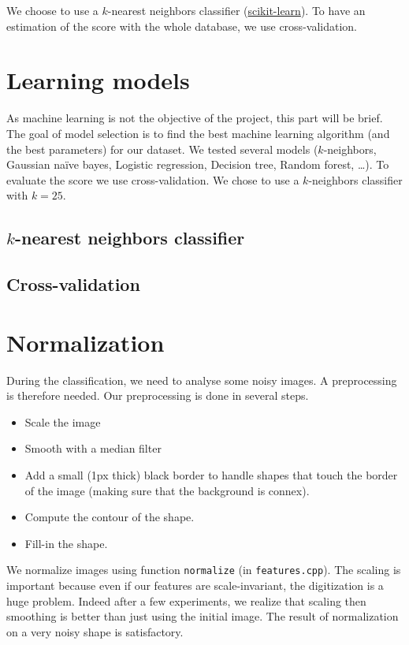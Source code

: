\documentclass[a4paper, 11pt]{article}
\begin{document}
\noindent We choose to use a $k$-nearest neighbors classifier (\href{http://scikit-learn.org/stable/modules/generated/sklearn.neighbors.KNeighborsClassifier.html}{scikit-learn}).
To have an estimation of the score with the whole database, we use cross-validation.

\newpage
\section{Learning models}

As machine learning is not the objective of the project, this part will be brief. The goal of model selection is to find the best machine learning algorithm (and the best parameters) for our dataset. We tested several models ($k$-neighbors, Gaussian naïve bayes, Logistic regression, Decision tree, Random forest, \dots). To evaluate the score we use cross-validation. We chose to use a $k$-neighbors classifier with $k= 25$.


\subsection{$k$-nearest neighbors classifier}


\subsection{Cross-validation}


\newpage
\section{Normalization}

During the classification, we need to analyse some noisy images. A preprocessing is therefore needed. Our preprocessing is done in several steps.
\begin{itemize}
  \item Scale the image
  \item Smooth with a median filter
	\item Add a small (1px thick) black border to handle shapes that touch the border of the image (making sure that the background is connex).
	\item Compute the contour of the shape.
	\item Fill-in the shape.
\end{itemize}

\noindent We normalize images using function \verb|normalize| (in \verb|features.cpp|).
The scaling is important because even if our features are scale-invariant, the digitization is a huge problem. Indeed after a few experiments, we realize that scaling then smoothing is better than just using the initial image. The result of normalization on a very noisy shape is satisfactory. 
\end{document}

